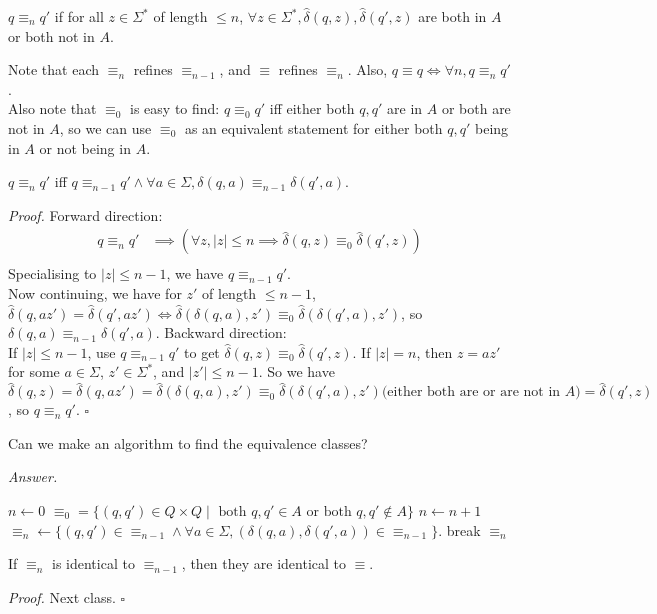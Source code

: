\documentclass[a4paper]{article}
\newenvironment{proof}{\begin{breakbox}\textit{Proof.}}{\hfill$\square$\end{breakbox}}
\newenvironment{ans}{\begin{breakbox}\textit{Answer.}}{\end{breakbox}}
\newcommand{\nl}{\vspace{0.2cm}\\}
\newcommand{\hd}{\hat{\delta}}
\begin{document}
\begin{defn}
    $q \equiv_n q'$ if for all $z \in \Sigma^*$ of length $\le n$, $\forall z \in \Sigma^*, \hd(q, z), \hd(q', z)$ are both in $A$ or both not in $A$.
\end{defn}

\begin{note}
    Note that each $\equiv_n$ refines $\equiv_{n-1}$, and $\equiv$ refines $\equiv_n$. Also, $q \equiv q \iff \forall n, q \equiv_n q'$.\nl
    Also note that $\equiv_0$ is easy to find: $q \equiv_0 q'$ iff either both $q, q'$ are in $A$ or both are not in $A$, so we can use $\equiv_0$ as an equivalent statement for either both $q, q'$
    being in $A$ or not being in $A$.
\end{note}

\begin{claim}
    $q \equiv_n q'$ iff $q \equiv_{n-1} q' \land \forall a \in \Sigma, \delta(q, a) \equiv_{n-1} \delta(q', a)$.
\end{claim}

\begin{proof}
    Forward direction:\nl
    \begin{align*}    
        q \equiv_n q' &\implies (\forall z, |z| \le n \implies \hd(q, z) \equiv_0 \hd(q', z))\\
    \end{align*}
    Specialising to $|z| \le n - 1$, we have $q \equiv_{n-1} q'$.\nl
    Now continuing, we have for $z'$ of length $\le n - 1$, $\hd(q, az') = \hd(q', az') \iff \hd(\delta(q, a), z') \equiv_0 \hd(\delta(q', a), z')$, so $\delta(q, a) \equiv_{n-1} \delta(q',
        a)$.
    Backward direction:\nl
    If $|z| \le n - 1$, use $q \equiv_{n-1} q'$ to get $\hd(q, z) \equiv_0 \hd(q', z)$.
    If $|z| = n$, then $z = az'$ for some $a \in \Sigma$, $z' \in \Sigma^*$, and $|z'| \le n - 1$. So we have $\hd(q, z) = \hd(q, az') = \hd(\delta(q, a), z') \equiv_0 \hd(\delta(q', a), z')
\text{(either both are or are not in $A$)} = \hd(q', z)$, so $q \equiv_n q'$.
\end{proof}

\begin{ques}
    Can we make an algorithm to find the equivalence classes?
\end{ques}

\begin{ans}
\begin{algorithmic}
        \State $n \gets 0$
        \State $\equiv_0 = \{(q, q') \in Q \times Q \mid \text{ both } q, q' \in A \text{ or both }q, q' \not\in A\}$
            \State $n \gets n + 1$
            \State $\equiv_n \gets \{(q, q') \in \equiv_{n-1} \land \forall a \in \Sigma, (\delta(q, a), \delta(q', a)) \in \equiv_{n-1}\}$.
                \State break
            \EndIf
        \EndWhile
        \State \Return $\equiv_n$
    \EndFunction
\end{algorithmic}
\end{ans}

\begin{claim}
    If $\equiv_n$ is identical to $\equiv_{n-1}$, then they are identical to $\equiv$.
\end{claim}

\begin{proof}
    Next class.
\end{proof}
\end{document}
